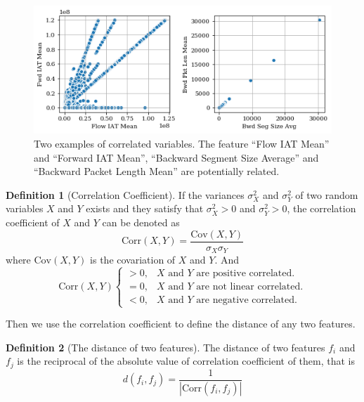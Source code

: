 \documentclass{ieeeaccess}
\theoremstyle{definition}
\newtheorem{defn}{Definition}
\begin{document}
\begin{figure}
    \centering
    \includegraphics[scale=0.5]{fig/scatter-correlated-variables.png}
    \caption{Two examples of correlated variables. The feature ``Flow IAT Mean'' and ``Forward IAT Mean'', ``Backward Segment Size Average'' and ``Backward Packet Length Mean'' are potentially related. }
    \label{fig:correlated-variables}
\end{figure}

\begin{defn}[Correlation Coefficient]
    If the variances $\sigma^2_X$ and $\sigma_Y^2$ of two random variables $X$ and $Y$ exists and they satisfy that $\sigma^2_X > 0$ and $\sigma^2_Y > 0$, the correlation coefficient of $X$ and $Y$ can be denoted as
    \begin{equation}
        \text{Corr}(X, Y) = \frac{\text{Cov}(X, Y)}{\sigma_X \sigma_Y}
    \end{equation}
    where $\text{Cov}(X, Y)$ is the covariation of $X$ and $Y$. And
    $$\text{Corr}(X, Y) 
    \begin{cases}
    > 0, & X \text{ and } Y \text{ are positive correlated.}\\
    = 0, & X \text{ and } Y \text{ are not linear correlated.} \\
    < 0, & X \text{ and } Y \text{ are negative correlated.}
    \end{cases}$$
\end{defn}

Then we use the correlation coefficient to define the distance of any two features.

\begin{defn}[The distance of two features]
\label{def:distance}
The distance of two features $f_i$ and $f_j$ is the reciprocal of the absolute value of correlation coefficient of them, that is
\begin{equation}
    \label{eq:distance}
    d(f_i, f_j) = \frac{1}{|\text{Corr}(f_i, f_j)|}
\end{equation}
\end{defn}
\end{document}
